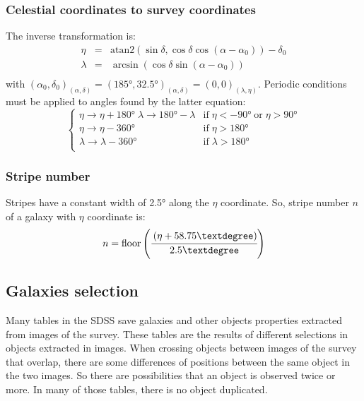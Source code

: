 \subsubsection{Celestial coordinates to survey coordinates}

The inverse transformation is:
%
\begin{eqnarray}
    \eta &=&
        \mathrm{atan2}
        \left(\sin\delta,\cos\delta\cos\left(\alpha-\alpha_0\right)\right)-
            \delta_0\nonumber\\
    \lambda &=&
        \arcsin\left(\cos\delta\sin\left(\alpha-\alpha_0\right)\right)
            \nonumber\\
\end{eqnarray}
%
with ${\left(\alpha_0,\delta_0\right)}_{\left(\alpha,\delta\right)}=
{\left(185°,32.5°\right)}_{\left(\alpha,\delta\right)}=
{\left(0,0\right)}_{\left(\lambda,\eta\right)}$. Periodic conditions must be
applied to angles found by the latter equation:
%
\begin{equation}
    \begin{cases}
        \eta\rightarrow\eta+180° \; \lambda\rightarrow180°-\lambda&
        \mbox{if}\;\eta<-90°\;\mbox{or}\; \eta>90°\\
        \eta\rightarrow\eta-360° &
        \mbox{if}\;\eta>180°\\
        \lambda\rightarrow\lambda-360° &
        \mbox{if}\;\lambda>180°\\
    \end{cases}
\end{equation}
%
\subsubsection{Stripe number}
%
Stripes have a constant width of 2.5° along the $\eta$ coordinate. So,
stripe number $n$ of a galaxy with $\eta$ coordinate is:
%
\begin{equation}
    n = \mathrm{floor}\left(\cfrac{\left(\eta+58.75°\right)}{2.5°}\right)
\end{equation}
%
\subsection{Galaxies selection}
%
Many tables in the SDSS save galaxies and other objects properties extracted
from images of the survey. These tables are the results of different
selections in objects extracted in images. When crossing objects between
images of the survey that overlap, there are some differences of positions
between the same object in the two images. So there are possibilities that
an object is observed twice or more. In many of those tables, there is no
object duplicated.

